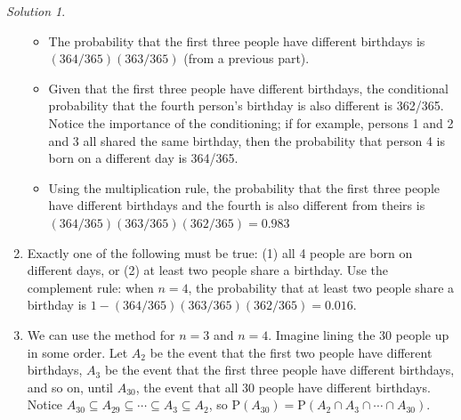 \documentclass[
  letterpaper,
  DIV=11,
  numbers=noendperiod]{scrreprt}
\providecommand{\tightlist}{%
  \setlength{\itemsep}{0pt}\setlength{\parskip}{0pt}}
\theoremstyle{plain}
\theoremstyle{definition}
\theoremstyle{definition}
\theoremstyle{definition}
\theoremstyle{remark}
\newtheorem{refsolution}{Solution}[chapter]
\begin{document}
\begin{tcolorbox}
\begin{refsolution}
\begin{enumerate}
  \begin{itemize}
  \tightlist
  \item
    The probability that the first three people have different birthdays
    is \((364/365)(363/365)\) (from a previous part).
  \item
    Given that the first three people have different birthdays, the
    conditional probability that the fourth person's birthday is also
    different is 362/365. Notice the importance of the conditioning; if
    for example, persons 1 and 2 and 3 all shared the same birthday,
    then the probability that person 4 is born on a different day is
    364/365.
  \item
    Using the multiplication rule, the probability that the first three
    people have different birthdays and the fourth is also different
    from theirs is \((364/365)(363/365)(362/365) = 0.983\)
  \end{itemize}
\item
  Exactly one of the following must be true: (1) all 4 people are born
  on different days, or (2) at least two people share a birthday. Use
  the complement rule: when \(n=4\), the probability that at least two
  people share a birthday is \(1-(364/365)(363/365)(362/365) = 0.016\).
\item
  We can use the method for \(n=3\) and \(n=4\). Imagine lining the 30
  people up in some order. Let \(A_2\) be the event that the first two
  people have different birthdays, \(A_3\) be the event that the first
  three people have different birthdays, and so on, until \(A_{30}\),
  the event that all 30 people have different birthdays. Notice
  \(A_{30}\subseteq A_{29} \subseteq \cdots \subseteq A_3 \subseteq A_2\),
  so
  \(\textrm{P}(A_{30}) = \textrm{P}(A_2 \cap A_3 \cap \cdots \cap A_{30})\).


\end{enumerate}
\end{refsolution}
\end{tcolorbox}
\end{document}
